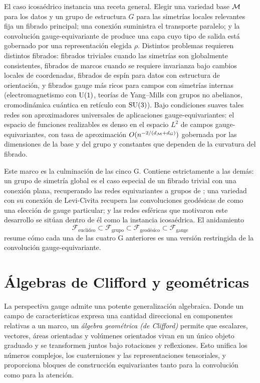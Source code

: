 El caso icosa\'edrico instancia una receta general. Elegir una variedad base
$\mathcal{M}$ para los datos y un grupo de estructura $G$ para las simetr\'ias locales
relevantes fija un fibrado principal; una conexi\'on suministra el transporte
paralelo; y la convoluci\'on gauge-equivariante de  produce
una capa cuyo tipo de salida est\'a gobernado por una representaci\'on elegida
$\rho$. Distintos problemas requieren distintos fibrados: fibrados triviales
cuando las simetr\'ias son globalmente consistentes, fibrados de marcos cuando se
requiere invarianza bajo cambios locales de coordenadas, fibrados de esp\'in para
datos con estructura de orientaci\'on, y fibrados gauge m\'as ricos para campos
con simetr\'ias internas (electromagnetismo con $\operatorname{U}(1)$, teor\'ias de
Yang--Mills con grupos no abelianos, cromodin\'amica cu\'antica en ret\'iculo con
$\operatorname{SU}(3)$). Bajo condiciones suaves tales redes son aproximadores universales de
aplicaciones gauge-equivariantes: el espacio de funciones realizables es denso en
el espacio $L^2$ de campos gauge-equivariantes, con tasa de aproximaci\'on
$O(n^{-2/(d_{\mathcal{M}} + d_G)})$ gobernada por las dimensiones de la base y del grupo y
constantes que dependen de la curvatura del fibrado.

Este marco es la culminaci\'on de las cinco G. Contiene estrictamente a las
dem\'as: un grupo de simetr\'ia global es el caso especial de un fibrado trivial
con una conexi\'on plana, recuperando las redes equivariantes a grupos de
; una variedad con su conexi\'on de Levi-Civita recupera las
convoluciones geod\'esicas de  como una elecci\'on de gauge
particular; y las redes esf\'ericas que motivaron este desarrollo se sit\'uan
dentro de \'el como la instancia icosa\'edrica. El anidamiento
\[
  \mathcal{F}_{\text{eucl\'ideo}} \subset \mathcal{F}_{\text{grupo}}
  \subset \mathcal{F}_{\text{geod\'esico}} \subset \mathcal{F}_{\text{gauge}}
\]
resume c\'omo cada una de las cuatro G anteriores es una versi\'on restringida de
la convoluci\'on gauge-equivariante.

\section{\'Algebras de Clifford y geom\'etricas}
\label{sec:gauge:clifford}

La perspectiva gauge admite una potente generalizaci\'on algebraica. Donde un
campo de caracter\'isticas expresa una cantidad direccional en componentes
relativas a un marco, un \emph{\'algebra geom\'etrica (de Clifford)} permite que
escalares, vectores, \'areas orientadas y vol\'umenes orientados vivan en un
\'unico objeto graduado y se transformen juntos bajo rotaciones y reflexiones.
Esto unifica los n\'umeros complejos, los cuaterniones y las representaciones
tensoriales, y proporciona bloques de construcci\'on equivariantes tanto para la
convoluci\'on como para la atenci\'on.

